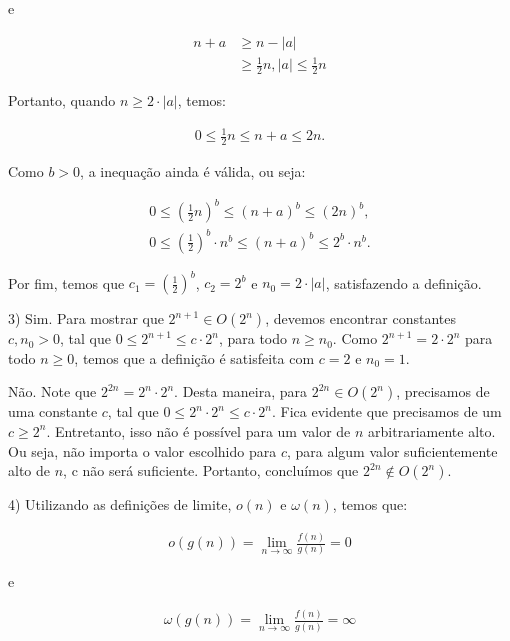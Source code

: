 \documentclass[]{article}
\begin{document}
e

\begin{align*}
    n+a & \geq n-|a| \\
        & \geq \frac{1}{2}n, |a| \leq \frac{1}{2}n
\end{align*}

Portanto, quando $n \geq 2 \cdot |a|$, temos:

\begin{align*}
    0 \leq \frac{1}{2}n \leq n+a \leq 2n.
\end{align*}

Como $b>0$, a inequação ainda é válida, ou seja:

\begin{align*}
    0 \leq (\frac{1}{2}n)^b \leq (n+a)^b \leq (2n)^b, \\
    0 \leq (\frac{1}{2})^b \cdot n^b \leq (n+a)^b \leq 2^b \cdot n^b.
\end{align*}

Por fim, temos que $c_1 = (\frac{1}{2})^b$, $c_2 = 2^b$ e $n_0 = 2 \cdot |a|$, satisfazendo a definição.

\vspace{1cm}

3) Sim. Para mostrar que $2^{n+1} \in O(2^n)$, devemos encontrar constantes $c, n_0 > 0$, tal que $0 \leq 2^{n+1} \leq c \cdot 2^n$, para todo $n \geq n_0$. Como $2^{n+1} = 2 \cdot 2^n$ para todo $n \geq 0$, temos que a definição é satisfeita com $c=2$ e $n_0=1$.

\vspace{0.5cm}

Não. Note que $2^{2n} = 2^n \cdot 2^n$. Desta maneira, para $2^{2n} \in O(2^n)$, precisamos de uma constante $c$, tal que $0 \leq 2^n \cdot 2^n \leq c \cdot 2^n$. Fica evidente que precisamos de um $c \geq 2^n$. Entretanto, isso não é possível para um valor de $n$ arbitrariamente alto. Ou seja, não importa o valor escolhido para $c$, para algum valor suficientemente alto de $n$, c não será suficiente. Portanto, concluímos que $2^{2n} \notin O(2^n)$.

\vspace{1cm}

4) Utilizando as definições de limite, $o(n)$ e $\omega(n)$, temos que:

\begin{align*}
    o(g(n)) = \lim_{n \to \infty} \frac{f(n)}{g(n)} = 0   
\end{align*}

e

\begin{align*}
    \omega(g(n)) = \lim_{n \to \infty} \frac{f(n)}{g(n)} = \infty   
\end{align*}
\end{document}
